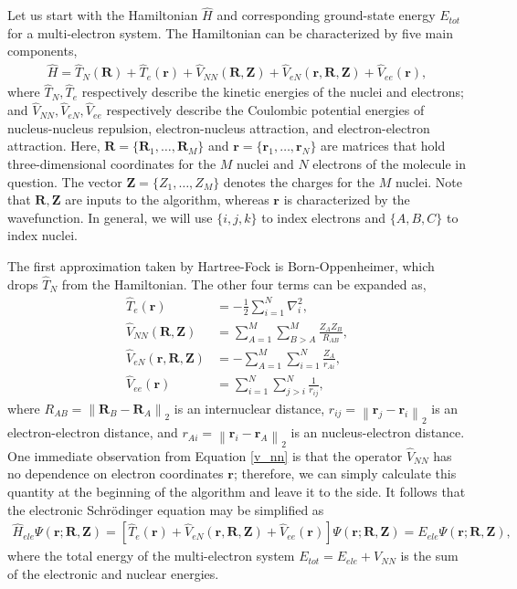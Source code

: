 \documentclass[12pt]{article}
\newcommand{\vect}[1]{\boldsymbol{#1}}
\newcommand{\norm}[1]{\left\lVert#1\right\rVert}
\begin{document}
Let us start with the Hamiltonian $\hat{H}$ and corresponding ground-state energy $E_{tot}$ for a multi-electron system.  The Hamiltonian can be characterized by five main components,
\begin{align}
\hat{H} = \hat{T}_N(\vect{R}) + \hat{T}_e(\vect{r}) + \hat{V}_{NN}(\vect{R}, \vect{Z}) + \hat{V}_{eN}(\vect{r}, \vect{R}, \vect{Z}) + \hat{V}_{ee}(\vect{r}),
\end{align}
where $\hat{T}_N, \hat{T}_e$ respectively describe the kinetic energies of the nuclei and electrons; and $\hat{V}_{NN}, \hat{V}_{eN}, \hat{V}_{ee}$ respectively describe the Coulombic potential energies of nucleus-nucleus repulsion, electron-nucleus attraction, and electron-electron attraction.  Here, $\vect{R} = \{\vect{R}_1, \ldots, \vect{R}_M\}$ and $\vect{r} = \{\vect{r}_1, \ldots, \vect{r}_N\}$ are matrices that hold three-dimensional coordinates for the $M$ nuclei and $N$ electrons of the molecule in question.  The vector $\vect{Z} = \{Z_1, \ldots, Z_M\}$ denotes the charges for the $M$ nuclei.  Note that $\vect{R}, \vect{Z}$ are inputs to the algorithm, whereas $\vect{r}$ is characterized by the wavefunction.  In general, we will use $\{i, j, k\}$ to index electrons and $\{A, B, C\}$ to index nuclei.     

The first approximation taken by Hartree-Fock is Born-Oppenheimer, which drops $\hat{T}_N$ from the Hamiltonian.  The other four terms can be expanded as,
\begin{align}
\hat{T}_e(\vect{r}) &= -\frac{1}{2} \sum_{i=1}^N \nabla_i^2 \label{t_e} , \\
\hat{V}_{NN}(\vect{R}, \vect{Z}) &= \sum_{A=1}^M \sum_{B > A}^M \frac{Z_A Z_B}{R_{AB}} \label{v_nn},\\
\hat{V}_{eN}(\vect{r}, \vect{R}, \vect{Z}) &=  - \sum_{A=1}^M \sum_{i=1}^N \frac{Z_{A}}{r_{Ai}} \label{v_en}, \\
\hat{V}_{ee}(\vect{r}) &= \sum_{i=1}^N \sum_{j > i}^N \frac{1}{r_{ij}} \label{v_ee}, 
\end{align}      
where $R_{AB} = \norm{\vect{R}_B - \vect{R}_A}_2$ is an internuclear distance, $r_{ij} = \norm{\vect{r}_j - \vect{r}_i}_2$ is an electron-electron distance, and $r_{Ai} = \norm{\vect{r}_i - \vect{r}_A}_2$ is an nucleus-electron distance.  One immediate observation from Equation \ref{v_nn} is that the operator $\hat{V}_{NN}$ has no dependence on electron coordinates $\vect{r}$; therefore, we can simply calculate this quantity at the beginning of the algorithm and leave it to the side.  It follows that the electronic Schr\"odinger equation may be simplified as 
\begin{align}
\hat{H}_{ele} \Psi(\vect{r}; \vect{R}, \vect{Z}) = \left[ \hat{T}_e(\vect{r}) + \hat{V}_{eN}(\vect{r}, \vect{R}, \vect{Z}) + \hat{V}_{ee}(\vect{r}) \right] \Psi(\vect{r}; \vect{R}, \vect{Z})= E_{ele} \Psi(\vect{r}; \vect{R}, \vect{Z}) \label{H_ele},
\end{align}
where the total energy of the multi-electron system $E_{tot} = E_{ele} + V_{NN}$ is the sum of the electronic and nuclear energies.
\end{document}
